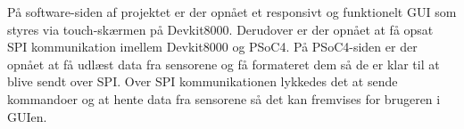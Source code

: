 
På software-siden af projektet er der opnået et responsivt og funktionelt GUI som styres via touch-skærmen på Devkit8000.  Derudover er der opnået at få opsat SPI kommunikation imellem Devkit8000 og PSoC4. På PSoC4-siden er der opnået at få udlæst data fra sensorene og få formateret dem så de er klar til at blive sendt over SPI. Over SPI kommunikationen lykkedes det at sende kommandoer og at hente data fra sensorene så det kan fremvises for brugeren i GUIen.